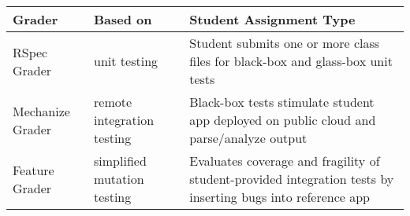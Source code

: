 {\small
\begin{tabular}{|p{}|p{}|p{}|}
 \hline
 \textbf{Grader} & \textbf{Based on} & \textbf{Student Assignment Type} \\
 \hline
 RSpec Grader &
 unit testing &
 Student submits one or more class files for black-box and glass-box
 unit tests
 \\
\hline
 Mechanize Grader & 
 \raggedright remote integration testing &
 Black-box tests stimulate student app deployed on public cloud
 and parse/analyze output
 \\
\hline
 Feature Grader &
 \raggedright simplified mutation testing &
 Evaluates coverage and fragility of student-provided integration tests
 by inserting bugs into reference app 
 \\
 \hline
\end{tabular}
}

